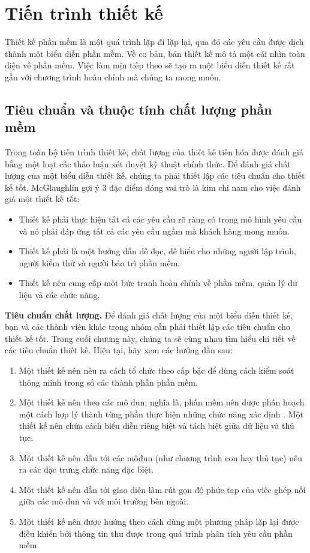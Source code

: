 \documentclass[./../SoftwareEngineering.tex]{subfiles}
\begin{document}
	\section{Tiến trình thiết kế}
	Thiết kế phần mềm là một quá trình lặp đi lặp lại, qua đó các yêu cầu được dịch thành một biểu diễn phần mềm. Về cơ bản, bản thiết kế mô tả một cái nhìn toàn diện về phần mềm. Việc làm mịn tiếp theo sẽ tạo ra một biểu diễn thiết kế rất gần với chương trình hoàn chỉnh mà chúng ta mong muốn.
	
	\subsection{Tiêu chuẩn và thuộc tính chất lượng phần mềm}
	Trong toàn bộ tiến trình thiết kế, chất lượng của thiết kế tiến hóa được đánh giá bằng một loạt các thảo luận xét duyệt kỹ thuật chính thức. Để đánh giá chất lượng của một biểu diễn thiết kế, chúng ta phải thiết lập các tiêu chuẩn cho thiết kế tốt. McGlaughlin \cites{McG91} gợi ý 3 đặc điểm đóng vai trò là kim chỉ nam cho việc đánh giá một thiết kế tốt:
	\begin{itemize}
		\item Thiết kế phải thực hiện tất cả các yêu cầu rõ ràng có trong mô hình yêu cầu và nó phải đáp ứng tất cả các yêu cầu ngầm mà khách hàng mong muốn.
		\item Thiết kế phải là một hướng dẫn dễ đọc, dễ hiểu cho những người lập trình, người kiểm thử và người bảo trì phần mềm.
		\item Thiết kế nên cung cấp một bức tranh hoàn chỉnh về phần mềm, quản lý dữ liệu và các chức năng.
	\end{itemize}
	\textbf{ Tiêu chuẩn chất lượng.} Để đánh giá chất lượng của một biểu diễn thiết kế, bạn và các thành viên khác trong nhóm cần phải thiết lập các tiêu chuẩn cho thiết kế tốt. Trong cuối chương này, chúng ta sẽ cùng nhau tìm hiểu chi tiết về các tiêu chuẩn thiết kế. Hiện tại, hãy xem các hướng dẫn sau:
	\begin{enumerate}
		\item Một thiết kế nên nêu ra cách tổ chức theo cấp bậc để dùng cách kiểm soát thông minh trong số các thành phần phần mềm.
		\item Một thiết kế nên theo các mô đun; nghĩa là, phần mềm nên được phân hoạch một cách hợp lý thành từng phần thực hiện những chức năng xác định . 
		Một thiết kế nên chứa cách biểu diễn riêng biệt và tách biệt giữa dữ liệu và thủ tục.
		\item Một thiết kế nên dẫn tới các môđun (như chương trình con hay thủ tục) nêu ra các đặc trưng chức năng đặc biệt. 
		\item Một thiết kế nên dẫn tới giao diện làm rút gọn độ phức tạp của việc ghép nối giữa các mô đun và với môi trường bên ngoài. 
		\item Một thiết kế nên được hướng theo cách dùng một phương pháp lặp lại được điều khiển bởi thông tin thu được trong quá trình phân tích yêu cầu phần mềm. 
		
	\end{enumerate}
	
\end{document}
